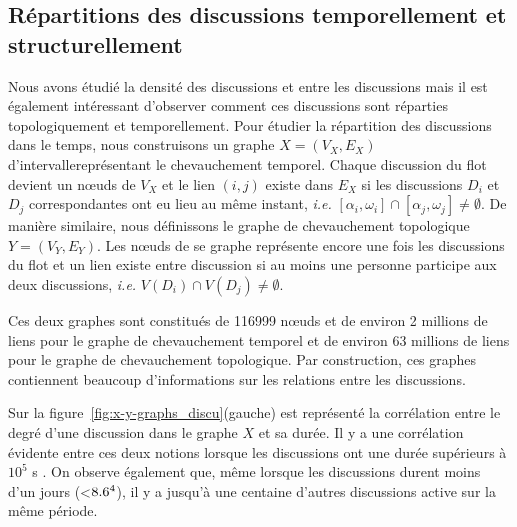 \subsection{Répartitions des discussions temporellement et structurellement}

Nous avons étudié la densité des discussions et entre les discussions mais il est également intéressant d'observer comment ces discussions sont réparties topologiquement et temporellement.
Pour étudier la répartition des discussions dans le temps, nous construisons un graphe $X=(V_X,E_X)$ d'intervalle\REF représentant le chevauchement temporel.
Chaque discussion du flot devient un n\oe uds de $V_X$ et le lien $(i,j)$ existe dans $E_X$ si les discussions $D_i$ et $D_j$ correspondantes ont eu lieu au même instant, \emph{i.e.} $[\alpha_i, \omega_i] \cap [\alpha_j, \omega_j] \neq \emptyset$.
De manière similaire, nous définissons le graphe de chevauchement topologique $Y=(V_Y,E_Y)$.
Les n\oe uds de se graphe représente encore une fois les discussions du flot et un lien existe entre discussion si au moins une personne participe aux deux discussions, \emph{i.e.} $V(D_i) \cap V(D_j) \neq \emptyset$.

Ces deux graphes sont constitués de 116999 n\oe uds et de environ 2 millions de liens pour le graphe de chevauchement temporel et de environ 63 millions de liens pour le graphe de chevauchement topologique.
Par construction, ces graphes contiennent beaucoup d'informations sur les relations entre les discussions.

Sur la figure~\ref{fig:x-y-graphs_discu}(gauche) est représenté la corrélation entre le degré d'une discussion dans le graphe $X$ et sa durée.
Il y a une corrélation évidente entre ces deux notions lorsque les discussions ont une durée supérieurs à $10^5$ s .
On observe également que, même lorsque les discussions durent moins d'un jours (<$8.6\time10^4$), il y a jusqu'à une centaine d'autres discussions active sur la même période.

